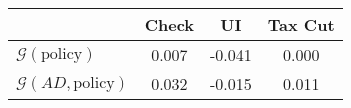\begin{tabular}{@{}lccc@{}} 
\toprule 
                          & Check      & UI    & Tax Cut    \\  \midrule 
$\mathcal{G}(\text{policy})$ & 0.007  & -0.041  & 0.000     \\ 
$\mathcal{G}(AD,\text{policy})$ & 0.032  & -0.015  & 0.011     \\ 
\end{tabular}  

